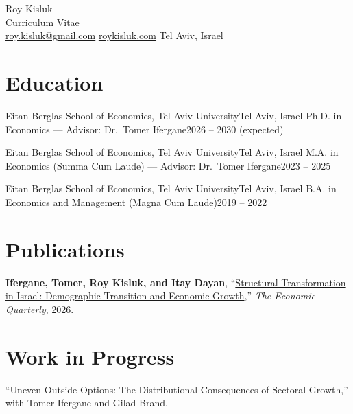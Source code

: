 \documentclass[a4paper, 10pt]{article}
\begin{document}
\begin{center}
  {\fontsize{26pt}{26pt}\selectfont Roy Kisluk}\\[4pt]
  {\large Curriculum Vitae}\\[6pt]
  \href{mailto:roy.kisluk@gmail.com}{roy.kisluk@gmail.com} \;\textbullet\;
  \href{https://roykisluk.com}{roykisluk.com} \;\textbullet\;
  Tel Aviv, Israel
\end{center}
\vspace{4pt}

\section{Education}
\cventry
{Eitan Berglas School of Economics, Tel Aviv University}{Tel Aviv, Israel}
{Ph.D. in Economics --- Advisor: Dr.\ Tomer Ifergane}{2026 -- 2030 (expected)}

\cventry
{Eitan Berglas School of Economics, Tel Aviv University}{Tel Aviv, Israel}
{M.A. in Economics (Summa Cum Laude) --- Advisor: Dr.\ Tomer Ifergane}{2023 -- 2025}

\cventry
{Eitan Berglas School of Economics, Tel Aviv University}{Tel Aviv, Israel}
{B.A. in Economics and Management (Magna Cum Laude)}{2019 -- 2022}

\section{Publications}
\cvEnum
\item \textbf{Ifergane, Tomer, Roy Kisluk, and Itay Dayan},
``\href{https://roykisluk.com/papers/structural-transformation-israel.pdf}{Structural Transformation in
Israel: Demographic Transition and Economic Growth},'' \textit{The Economic Quarterly}, 2026.
\cvEnumEnd

\section{Work in Progress}
\cvEnum
\item ``Uneven Outside Options: The Distributional Consequences of Sectoral Growth,'' with Tomer Ifergane and Gilad Brand.
\cvEnumEnd
\end{document}
